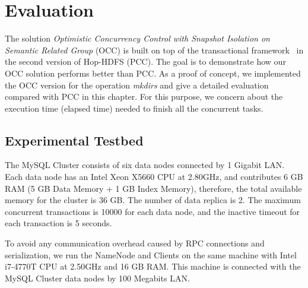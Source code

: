 
%
%


\chapter{Evaluation}
\label{ch:evaluation}

The solution \textit{Optimistic Concurrency Control with Snapshot Isolation on Semantic Related Group} (OCC) is built on top of the transactional framework~\cite{peiro2013maintaining} in the second version of Hop-HDFS (PCC). The goal is to demonstrate how our OCC solution performs better than PCC. As a proof of concept, we implemented the OCC version for the operation \textit{mkdirs} and give a detailed evaluation compared with PCC in this chapter. For this purpose, we concern about the execution time (elapsed time) needed to finish all the concurrent tasks.

\section{Experimental Testbed}
\label{sec:testbed}

The MySQL Cluster consists of six data nodes connected by 1 Gigabit LAN. Each data node has an Intel Xeon X5660 CPU at 2.80GHz, and contributes 6 GB RAM (5 GB Data Memory + 1 GB Index Memory), therefore, the total available memory for the cluster is 36 GB. The number of data replica is 2. The maximum concurrent transactions is 10000 for each data node, and the inactive timeout for each transaction is 5 seconds. 

\noindent To avoid any communication overhead caused by RPC connections and serialization, we run the NameNode and Clients on the same machine with Intel i7-4770T CPU at 2.50GHz and 16 GB RAM. This machine is connected with the MySQL Cluster data nodes by 100 Megabits LAN.


